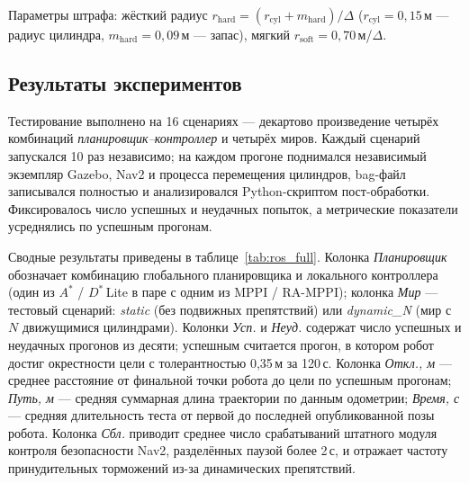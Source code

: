 \documentclass[a4paper,12pt]{extarticle}
\begin{document}
    Параметры штрафа: жёсткий радиус $r_{\mathrm{hard}} = (r_{\mathrm{cyl}} + m_{\mathrm{hard}}) / \Delta$ ($r_{\mathrm{cyl}} = 0{,}15$\,м --- радиус цилиндра, $m_{\mathrm{hard}} = 0{,}09$\,м --- запас), мягкий $r_{\mathrm{soft}} = 0{,}70$\,м/$\Delta$.

    \subsection{Результаты экспериментов}

    Тестирование выполнено на 16 сценариях --- декартово произведение четырёх комбинаций \textit{планировщик--контроллер} и четырёх миров. Каждый сценарий запускался 10 раз независимо; на каждом прогоне поднимался независимый экземпляр Gazebo, Nav2 и процесса перемещения цилиндров, bag-файл записывался полностью и анализировался Python-скриптом пост-обработки. Фиксировалось число успешных и неудачных попыток, а метрические показатели усреднялись по успешным прогонам.

    Сводные результаты приведены в таблице~\ref{tab:ros_full}. Колонка \textit{Планировщик} обозначает комбинацию глобального планировщика и локального контроллера (один из $A^*$ / $D^*$\,Lite в паре с одним из MPPI / RA-MPPI); колонка \textit{Мир} --- тестовый сценарий: \textit{static} (без подвижных препятствий) или \textit{dynamic\_N} (мир с $N$ движущимися цилиндрами). Колонки \textit{Усп.} и \textit{Неуд.} содержат число успешных и неудачных прогонов из десяти; успешным считается прогон, в котором робот достиг окрестности цели с толерантностью 0{,}35\,м за 120\,с. Колонка \textit{Откл., м} --- среднее расстояние от финальной точки робота до цели по успешным прогонам; \textit{Путь, м} --- средняя суммарная длина траектории по данным одометрии; \textit{Время, с} --- средняя длительность теста от первой до последней опубликованной позы робота. Колонка \textit{Сбл.} приводит среднее число срабатываний штатного модуля контроля безопасности Nav2, разделённых паузой более 2\,с, и отражает частоту принудительных торможений из-за динамических препятствий.
\end{document}
